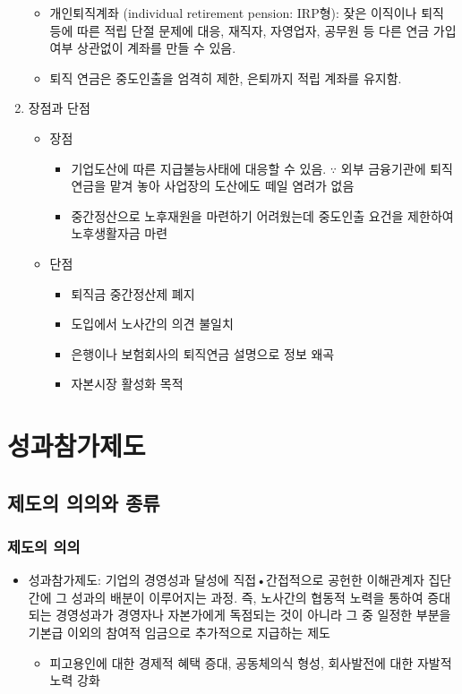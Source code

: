 \documentclass[aspectratio=169,xcolor=dvipsnames,handout]{beamer}
\begin{document}
\begin{frame}[allowframebreaks]
\begin{enumerate}[<+->]
\begin{itemize}[<+->]
            \item 개인퇴직계좌 (individual retirement pension: IRP형): 잦은 이직이나 퇴직 등에 따른 적립 단절 문제에 대응, 재직자, 자영업자, 공무원 등 다른 연금 가입여부 상관없이 계좌를 만들 수 있음.
            \item 퇴직 연금은 중도인출을 엄격히 제한, 은퇴까지 적립 계좌를 유지함.
        \end{itemize}
    \framebreak%
        \item 장점과 단점
        \begin{itemize}[<+->]
            \item 장점
            \begin{itemize}[<+->]
                \item 기업도산에 따른 지급불능사태에 대응할 수 있음. $\because$ 외부 금융기관에 퇴직연금을 맡겨 놓아 사업장의 도산에도 떼일 염려가 없음
                \item 중간정산으로 노후재원을 마련하기 어려웠는데 중도인출 요건을 제한하여 노후생활자금 마련
            \end{itemize}
            \item 단점
            \begin{itemize}[<+->]
                \item 퇴직금 중간정산제 폐지
                \item 도입에서 노사간의 의견 불일치
                \item 은행이나 보험회사의 퇴직연금 설명으로 정보 왜곡
                \item 자본시장 활성화 목적
            \end{itemize}
        \end{itemize}
    \end{enumerate}
\end{frame}

\section{성과참가제도}%
\subsection{제도의 의의와 종류}%

\begin{frame}[allowframebreaks]
    \frametitle{제도의 의의}
    \begin{itemize}[<+->]
        \item 성과참가제도: 기업의 경영성과 달성에 직접•간접적으로 공헌한 이해관계자 집단간에 그 성과의 배분이 이루어지는 과정. 즉, 노사간의 협동적 노력을 통하여 증대되는 경영성과가 경영자나 자본가에게 독점되는 것이 아니라 그 중 일정한 부분을 기본급 이외의 참여적 임금으로 추가적으로 지급하는 제도
        \begin{itemize}[<+->]
            \item 피고용인에 대한 경제적 혜택 증대, 공동체의식 형성, 회사발전에 대한 자발적 노력 강화
        \end{itemize}
    \end{itemize}
\end{frame}
\end{document}
